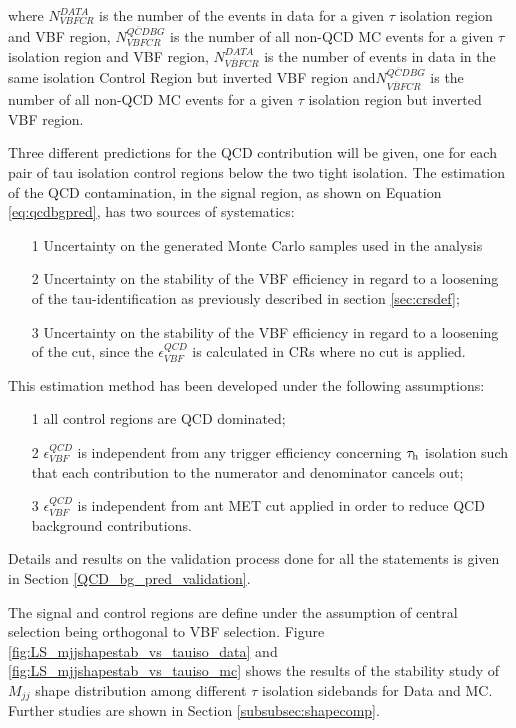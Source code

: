 where $N^{DATA}_{VBF CR}$ is the number of the events in data for a given $ \tau $ isolation region and VBF region, $N^{\overline{QCD} BG}_{VBFCR}$ is the number of all non-QCD MC events for a given $ \tau $ isolation region and VBF region, $N^{DATA}_{\overline{VBF}CR}$ is the number of events in data in the same isolation Control Region but inverted VBF region and$N^{\overline{QCD} BG}_{\overline{VBF}CR}$ is the number of all non-QCD MC events for a given $ \tau $ isolation region but inverted VBF region.

Three different predictions for the QCD contribution will be given, one for each pair of tau isolation control regions below the two tight isolation. The estimation of the QCD contamination, in the signal region,  as shown on Equation \ref{eq:qcdbgpred}, has two sources of systematics:  

\begin{itemize}
	\item[1]Uncertainty on the generated Monte Carlo samples used in the analysis
	\item[2]  Uncertainty on the stability of the VBF efficiency in regard to a loosening of the tau-identification as previously described in section \ref{sec:crsdef};
	\item[3] Uncertainty on the stability of the VBF efficiency in regard to a loosening of the \met cut, since the $\epsilon^{QCD}_{VBF}$ is calculated in CRs where no \met cut is applied.
\end{itemize}

This estimation method has been developed under the following assumptions:

\begin{itemize}
	\item[1] all control regions are QCD dominated;
	\item[2] $\epsilon^{QCD}_{VBF}$ is independent from any trigger efficiency concerning $\tau_{\text{h}}$ isolation such that each contribution to the numerator and denominator cancels out;
	\item[3] $\epsilon^{QCD}_{VBF}$ is independent from ant MET cut applied in order to reduce QCD background contributions. 
\end{itemize}

Details and results on the validation process done for all the statements is given in Section \ref{QCD_bg_pred_validation}.

The signal and control regions are define under the assumption of central selection being orthogonal to VBF selection. Figure \ref{fig:LS_mjjshapestab_vs_tauiso_data} and \ref{fig:LS_mjjshapestab_vs_tauiso_mc} shows the results of the stability study of $M_{jj}$ shape distribution among different $\tau$ isolation sidebands for Data and MC. Further studies are shown in Section \ref{subsubsec:shapecomp}.

